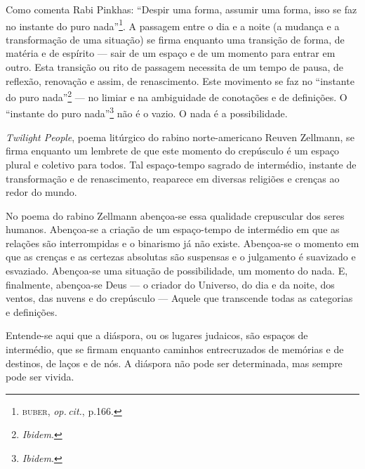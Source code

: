 Como comenta Rabi Pinkhas: ``Despir uma forma, assumir uma forma,
isso se faz no instante do puro nada''\footnote{\textsc{buber}, \emph{op.\,cit.}, p.166.}.
A passagem entre o dia e a noite (a mudança e a transformação de uma
situação) se firma enquanto uma transição de forma, de matéria e de
espírito --- sair de um espaço e de um momento para entrar em outro.
Esta transição ou rito de passagem necessita de um tempo de pausa, de
reflexão, renovação e assim, de renascimento. Este movimento se faz no
``instante do puro nada''\footnote{\emph{Ibidem}.} --- no limiar e na
ambiguidade de conotações e de definições. O ``instante do puro
nada''\footnote{\emph{Ibidem}.} não é o vazio. O nada é a possibilidade.

\emph{Twilight People}, poema litúrgico do rabino norte-americano Reuven
Zellmann, se firma enquanto um lembrete de que este momento do
crepúsculo é um espaço plural e coletivo para todos. Tal espaço-tempo
sagrado de intermédio, instante de transformação e de renascimento,
reaparece em diversas religiões e crenças ao redor do mundo.

No poema do rabino Zellmann abençoa-se essa qualidade crepuscular dos
seres humanos. Abençoa-se a criação de um espaço-tempo de intermédio em
que as relações são interrompidas e o binarismo já não existe.
Abençoa-se o momento em que as crenças e as certezas absolutas são
suspensas e o julgamento é suavizado e esvaziado. Abençoa-se uma
situação de possibilidade, um momento do nada. E, finalmente, abençoa-se
Deus --- o criador do Universo, do dia e da noite, dos ventos, das
nuvens e do crepúsculo --- Aquele que transcende todas as categorias e
definições.

Entende-se aqui que a diáspora, ou os lugares judaicos, são espaços de
intermédio, que se firmam enquanto caminhos entrecruzados de memórias e
de destinos, de laços e de nós. A diáspora não pode ser determinada, mas
sempre pode ser vivida.

